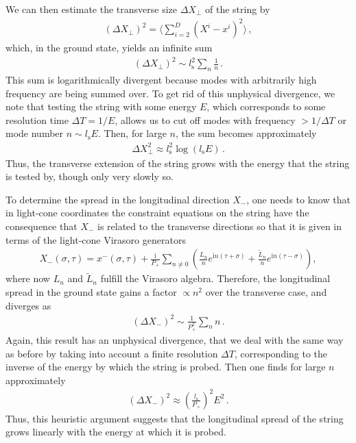 \documentclass{article}
\def\beqn{\begin{eqnarray}}
\def\eeqn{\end{eqnarray}}
\begin{document}
We can then estimate the transverse size $\Delta X_\perp$ of the string by
\beqn
(\Delta X_\perp)^2 = \langle \sum_{i=2}^D (X^i - x^i)^2 \rangle \,,
\eeqn
which, in the ground state, yields an infinite sum
\beqn
(\Delta X_\perp)^2 \sim l_{\mathrm{s}}^2 \sum_n \frac{1}{n} \,.
\eeqn
This sum is logarithmically divergent because modes with arbitrarily high frequency are being summed over. To
get rid of this unphysical divergence, we note that testing the string with some energy $E$,
which corresponds to some resolution time $\Delta T = 1/E$, allows us to cut off 
modes with frequency $>1/\Delta T$ or mode number $n \sim l_{\mathrm{s}} E$. Then, for large $n$, the sum becomes approximately
\beqn
\Delta X^2_\perp \approx l_{\mathrm{s}}^2 \log ( l_{\mathrm{s}} E ) \,.
\eeqn
Thus, the transverse extension of the string grows
with the energy that the string is tested by, though only very slowly so. 

To determine the spread in the longitudinal direction $X_-$, one needs to know that in light-cone coordinates the constraint equations
on the string have the consequence that $X_-$ is related to the transverse directions so that it is given in
terms of the light-cone Virasoro generators
\beqn
X_-(\sigma,\tau) = x^-(\sigma,\tau) + \frac{\mathrm{i}}{P_+} \sum_{n \neq 0} \left( \frac{L_n}{n} e^{\mathrm{i}n(\tau+\sigma)} + \frac{\tilde{L}_n}{n} e^{ \mathrm{i}n (\tau - \sigma)} \right) ,
\eeqn
where now $L_n$ and $\tilde L_n$ fulfill the Virasoro algebra. Therefore, the longitudinal 
spread in the ground state gains a factor $\propto n^2$ over the transverse case, and  diverges as
\beqn
 (\Delta X_-)^2 \sim \frac{1}{P_+^2} \sum_n  n  \,.
\eeqn
Again, this result has an unphysical divergence, that we deal with the same way as before by taking into account
a finite resolution $\Delta T$, corresponding to the inverse of the energy by which the string is probed.  Then one finds
for large $n$ approximately
\beqn
 (\Delta X_-)^2  \approx \left( \frac{l_{\mathrm{s}}}{P_+} \right)^2 E^2 \,.
\eeqn
Thus, this heuristic argument suggests that the longitudinal spread of the string grows linearly with the energy at which it is
probed.
\end{document}
